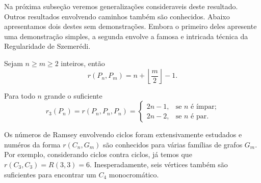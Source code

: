 Na próxima subseção veremos generalizações consideraveis deste resultado. Outros resultados envolvendo caminhos também são conhecidos. Abaixo apresentamos dois destes sem demonstrações. Embora o primeiro deles apresente uma demonstração simples, a segunda envolve a famosa e intricada técnica da Regularidade de Szemerédi.

\begin{theorem}
\label{graph:thm:path}
Sejam $n \geq m \geq 2$ inteiros, então
\[r(P_n, P_m) = n + \left \lfloor \frac{m}{2} \right \rfloor - 1.\]
\end{theorem}

\begin{theorem}
Para todo $n$ grande o suficiente
\[r_3(P_n) = r(P_n, P_n, P_n) = \begin{cases}
  2n - 1 , & \text{se } n \text{ é ímpar;} \\
  2n - 2, & \text{se } n \text{ é par.}
\end{cases}\]
\end{theorem}

Os números de Ramsey envolvendo ciclos foram extensivamente estudados e numéros da forma $r(C_n, G_m)$ são conhecidos para várias famílias de grafos $G_m$. Por exemplo, considerando ciclos contra ciclos, já temos que $r(C_3, C_3) = R(3,3) = 6$. Inesperadamente, seis vértices também são suficientes para encontrar um $C_4$ monocromático.

